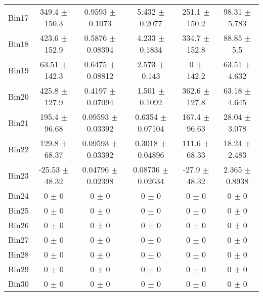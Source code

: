 \begin{tabular}{@{\extracolsep{4pt}}lccccc@{}}
     Bin17 & 349.4 $\pm$ 150.3 & 0.9593 $\pm$ 0.1073 & 5.432 $\pm$ 0.2077 & 251.1 $\pm$ 150.2 & 98.31 $\pm$ 5.783 \\ 
     Bin18 & 423.6 $\pm$ 152.9 & 0.5876 $\pm$ 0.08394 & 4.233 $\pm$ 0.1834 & 334.7 $\pm$ 152.8 & 88.85 $\pm$ 5.5 \\ 
     Bin19 & 63.51 $\pm$ 142.3 & 0.6475 $\pm$ 0.08812 & 2.573 $\pm$ 0.143 & 0 $\pm$ 142.2 & 63.51 $\pm$ 4.632 \\ 
     Bin20 & 425.8 $\pm$ 127.9 & 0.4197 $\pm$ 0.07094 & 1.501 $\pm$ 0.1092 & 362.6 $\pm$ 127.8 & 63.18 $\pm$ 4.645 \\ 
     Bin21 & 195.4 $\pm$ 96.68 & 0.09593 $\pm$ 0.03392 & 0.6354 $\pm$ 0.07104 & 167.4 $\pm$ 96.63 & 28.04 $\pm$ 3.078 \\ 
     Bin22 & 129.8 $\pm$ 68.37 & 0.09593 $\pm$ 0.03392 & 0.3018 $\pm$ 0.04896 & 111.6 $\pm$ 68.33 & 18.24 $\pm$ 2.483 \\ 
     Bin23 & -25.53 $\pm$ 48.32 & 0.04796 $\pm$ 0.02398 & 0.08736 $\pm$ 0.02634 & -27.9 $\pm$ 48.32 & 2.365 $\pm$ 0.8938 \\ 
     Bin24 & 0 $\pm$ 0 & 0 $\pm$ 0 & 0 $\pm$ 0 & 0 $\pm$ 0 & 0 $\pm$ 0 \\ 
     Bin25 & 0 $\pm$ 0 & 0 $\pm$ 0 & 0 $\pm$ 0 & 0 $\pm$ 0 & 0 $\pm$ 0 \\ 
     Bin26 & 0 $\pm$ 0 & 0 $\pm$ 0 & 0 $\pm$ 0 & 0 $\pm$ 0 & 0 $\pm$ 0 \\ 
     Bin27 & 0 $\pm$ 0 & 0 $\pm$ 0 & 0 $\pm$ 0 & 0 $\pm$ 0 & 0 $\pm$ 0 \\ 
     Bin28 & 0 $\pm$ 0 & 0 $\pm$ 0 & 0 $\pm$ 0 & 0 $\pm$ 0 & 0 $\pm$ 0 \\ 
     Bin29 & 0 $\pm$ 0 & 0 $\pm$ 0 & 0 $\pm$ 0 & 0 $\pm$ 0 & 0 $\pm$ 0 \\ 
     Bin30 & 0 $\pm$ 0 & 0 $\pm$ 0 & 0 $\pm$ 0 & 0 $\pm$ 0 & 0 $\pm$ 0 \\ 
\hline\hline
  \end{tabular}
